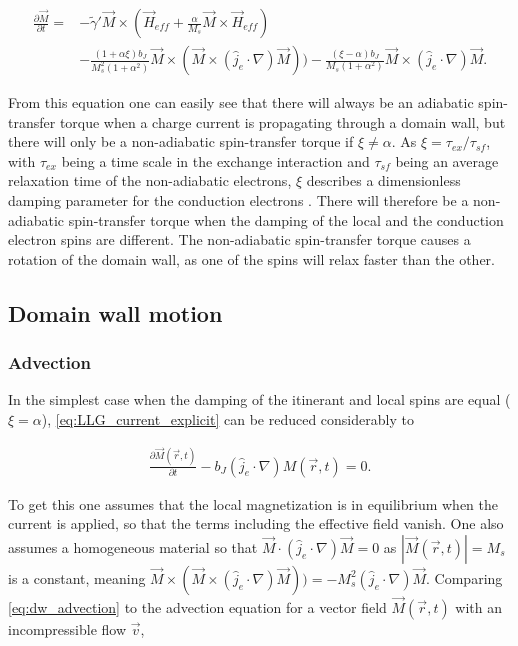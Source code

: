 \documentclass[1p]{elsarticle}		%
\numberwithin{equation}{section}
\begin{document}
\begin{align}
\nonumber \frac{\partial \vec{M}}{\partial t} = &-\tilde{\gamma}' \vec{M} \times  (\vec{H}_{eff} + \frac{\alpha}{M_s} \vec{M}\times \vec{H}_{eff}) \\ 
&- \frac{(1+\alpha\xi) b_J}{M_s^2(1+\alpha^2)} \vec{M}\times (\vec{M}\times(\hat{j}_e\cdot\nabla)\vec{M})) - \frac{(\xi-\alpha)b_J}{ M_s(1+\alpha^2)}\vec{M}\times(\hat{j}_e\cdot\nabla)\vec{M}.
\label{eq:LLG_current_explicit}
\end{align}

From this equation one can easily see that there will always be an adiabatic spin-transfer torque when a charge current is propagating through a domain wall, but there will only be a non-adiabatic spin-transfer torque if $\xi \neq \alpha$. As $\xi = \tau_{ex}/\tau_{sf}$, with $\tau_{ex}$ being a time scale in the exchange interaction and $\tau_{sf}$ being an average relaxation time of the non-adiabatic electrons, $\xi$ describes a dimensionless damping parameter for the conduction electrons \cite{kruger2006current}. There will therefore be a non-adiabatic spin-transfer torque when the damping of the local and the conduction electron spins are different. The non-adiabatic spin-transfer torque causes a rotation of the domain wall, as one of the spins will relax faster than the other.

\subsection{Domain wall motion}

\subsubsection{Advection}
In the simplest case when the damping of the itinerant and local spins are equal ($\xi = \alpha$), \eqref{eq:LLG_current_explicit} can be reduced considerably to

\begin{align}
\label{eq:dw_advection}
\frac{\partial \vec{M}(\vec{r}, t)}{\partial t} - b_J(\hat{j}_e\cdot\nabla) M(\vec{r}, t) = 0.
\end{align}

To get this one assumes that the local magnetization is in equilibrium when the current is applied, so that the terms including the effective field vanish. One also assumes a homogeneous material so that $\vec{M}\cdot(\hat{j}_e\cdot\nabla)\vec{M} = 0$ as $|\vec{M}(\vec{r}, t)| = M_s$ is a constant, meaning $\vec{M}\times (\vec{M}\times(\hat{j}_e\cdot\nabla)\vec{M})) = -M_s^2(\hat{j}_e\cdot\nabla)\vec{M}$. Comparing \eqref{eq:dw_advection} to the advection equation for a vector field $\vec{M}(\vec{r}, t)$ with an incompressible flow $\vec{v}$,
\end{document}
